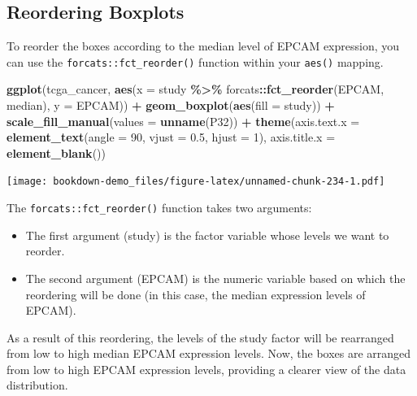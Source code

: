 \documentclass[
]{book}
\newenvironment{Shaded}{\begin{snugshade}}{\end{snugshade}}
\newcommand{\AttributeTok}[1]{\textcolor[rgb]{0.13,0.29,0.53}{#1}}
\newcommand{\DecValTok}[1]{\textcolor[rgb]{0.00,0.00,0.81}{#1}}
\newcommand{\FloatTok}[1]{\textcolor[rgb]{0.00,0.00,0.81}{#1}}
\newcommand{\FunctionTok}[1]{\textcolor[rgb]{0.13,0.29,0.53}{\textbf{#1}}}
\newcommand{\NormalTok}[1]{#1}
\newcommand{\SpecialCharTok}[1]{\textcolor[rgb]{0.81,0.36,0.00}{\textbf{#1}}}
\begin{document}
\hypertarget{reordering-boxplots}{%
\subsection{Reordering Boxplots}\label{reordering-boxplots}}

To reorder the boxes according to the median level of EPCAM expression, you can use the \texttt{forcats::fct\_reorder()} function within your \texttt{aes()} mapping.

\begin{Shaded}
\begin{Highlighting}[]
\FunctionTok{ggplot}\NormalTok{(tcga\_cancer, }\FunctionTok{aes}\NormalTok{(}\AttributeTok{x =}\NormalTok{ study }\SpecialCharTok{\%\textgreater{}\%}
\NormalTok{                          forcats}\SpecialCharTok{::}\FunctionTok{fct\_reorder}\NormalTok{(EPCAM, median), }
                        \AttributeTok{y =}\NormalTok{ EPCAM)) }\SpecialCharTok{+}
  \FunctionTok{geom\_boxplot}\NormalTok{(}\FunctionTok{aes}\NormalTok{(}\AttributeTok{fill =}\NormalTok{ study)) }\SpecialCharTok{+}
  \FunctionTok{scale\_fill\_manual}\NormalTok{(}\AttributeTok{values =} \FunctionTok{unname}\NormalTok{(P32)) }\SpecialCharTok{+}
  \FunctionTok{theme}\NormalTok{(}\AttributeTok{axis.text.x =} \FunctionTok{element\_text}\NormalTok{(}\AttributeTok{angle =} \DecValTok{90}\NormalTok{, }\AttributeTok{vjust =} \FloatTok{0.5}\NormalTok{, }\AttributeTok{hjust =} \DecValTok{1}\NormalTok{),}
        \AttributeTok{axis.title.x =} \FunctionTok{element\_blank}\NormalTok{())}
\end{Highlighting}
\end{Shaded}

\texttt{[image: bookdown-demo\_files/figure-latex/unnamed-chunk-234-1.pdf]}

The \texttt{forcats::fct\_reorder()} function takes two arguments:

\begin{itemize}
\item
  The first argument (study) is the factor variable whose levels we want to reorder.
\item
  The second argument (EPCAM) is the numeric variable based on which the reordering will be done (in this case, the median expression levels of EPCAM).
\end{itemize}

As a result of this reordering, the levels of the study factor will be rearranged from low to high median EPCAM expression levels. Now, the boxes are arranged from low to high EPCAM expression levels, providing a clearer view of the data distribution.
\end{document}
